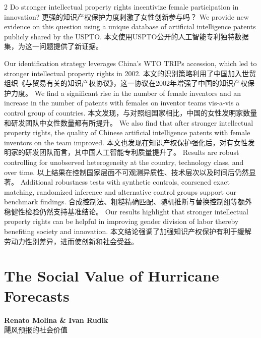 \documentclass[cn,hazy,blue,14pt,screen]{elegantnote}
\begin{document}
\begin{paracol}{2}
	Do stronger intellectual property rights incentivize female participation in innovation?
	\switchcolumn
	更强的知识产权保护力度刺激了女性创新参与吗？
	\switchcolumn*
	We provide new evidence on this question using a unique database of artificial intelligence patents publicly shared by the USPTO. 
	\switchcolumn
	本文使用USPTO公开的人工智能专利独特数据集，为这一问题提供了新证据。
	\switchcolumn*
	
	Our identification strategy leverages China’s WTO TRIPs accession, which led to stronger intellectual property rights in 2002. 
	\switchcolumn
	本文的识别策略利用了中国加入世贸组织《与贸易有关的知识产权协议》，这一协议在2002年增强了中国的知识产权保护力度。
	\switchcolumn*
	We find a significant rise in the number of female inventors and an increase in the number of patents with females on inventor teams vis-a-vis a control group of countries. 
	\switchcolumn
	本文发现，与对照组国家相比，中国的女性发明家数量和研发团队中女性数量都有所提升。
	\switchcolumn*
	We also find that after stronger intellectual property rights, the quality of Chinese artificial intelligence patents with female inventors on the team improved. 
	\switchcolumn
	本文也发现在知识产权保护强化后，对有女性发明家的研发团队而言，其中国人工智能专利质量提升了。
	\switchcolumn*
	Results are robust controlling for unobserved heterogeneity at the country, technology class, and over time. 
	\switchcolumn
	以上结果在控制国家层面不可观测异质性、技术层次以及时间后仍然显著。
	\switchcolumn*
	Additional robustness tests with synthetic controls, coarsened exact matching, randomized inference and alternative control groups support our benchmark findings. 
	\switchcolumn
	合成控制法、粗糙精确匹配、随机推断与替换控制组等额外稳健性检验仍然支持基准结论。
	\switchcolumn*
	Our results highlight that stronger intellectual property rights can be helpful in improving gender division of labor thereby benefiting society and innovation.
	\switchcolumn
	本文结论强调了加强知识产权保护有利于缓解劳动力性别差异，进而使创新和社会受益。
\end{paracol}

\section{The Social Value of Hurricane Forecasts}
\begin{center}
	\textbf{Renato Molina \& Ivan Rudik}\\
	飓风预报的社会价值
\end{center}
\end{document}
